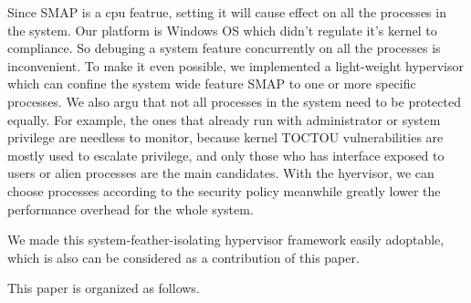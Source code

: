 
Since SMAP is a cpu featrue, setting it will cause effect on all the processes in the system. Our platform is Windows OS which didn't regulate it's kernel to compliance. So debuging a system feature concurrently on all the processes is inconvenient. To make it even possible, we implemented a light-weight hypervisor which can confine the system wide feature SMAP to one or more specific processes. We also argu that not all processes in the system need to be protected equally. For example, the ones that already run with administrator or system privilege are needless to monitor, because kernel TOCTOU vulnerabilities are mostly used to escalate privilege, and only those who has interface exposed to users or alien processes are the main candidates. With the hyervisor, we can choose processes according to the security policy meanwhile greatly lower the performance overhead for the whole system. 

We made this system-feather-isolating hypervisor framework easily adoptable, which is also can be considered as a contribution of this paper.


This paper is organized as follows. 
